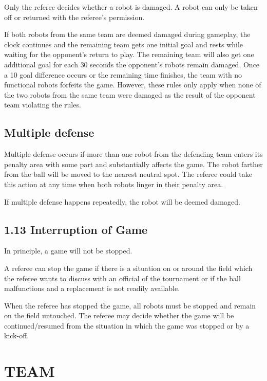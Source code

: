 \documentclass{article}
\begin{document}
Only the referee decides whether a robot is damaged. A robot can only be taken off or returned with the referee's permission. 

If both robots from the same team are deemed damaged during gameplay, the clock continues and the remaining team gets one initial goal and rests while waiting for the opponent's return to play. The remaining team will also get one additional goal for each \textcolor{color-5}{30 seconds} the opponent's robots remain damaged. \textcolor{color-5}{Once a 10 goal difference occurs or the remaining time finishes}, the team with no functional robots forfeits the game. However, these rules only apply when none of the two robots from the same team were damaged as the result of the opponent team violating the rules. 

\subsection{Multiple defense \label{ref-013}}

Multiple defense occurs if more than one robot from the defending team enters its penalty area with some part and substantially affects the game. The robot farther from the ball will be moved to the nearest neutral spot. The referee could take this action at any time when both robots linger in their penalty area. 

If multiple defense happens repeatedly, the robot will be deemed damaged. 

\subsection{1.13 Interruption of Game \label{ref-014}}

In principle, a game will not be stopped. 

A referee can stop the game if there is a situation on or around the field which the referee wants to discuss with an official of the tournament or if the ball malfunctions and a replacement is not readily available. 

When the referee has stopped the game, all robots must be stopped and remain on the field untouched. The referee may decide whether the game will be continued/resumed from the situation in which the game was stopped or by a kick-off.

\textbf{}

\section{TEAM \label{ref-015}}
\end{document}
